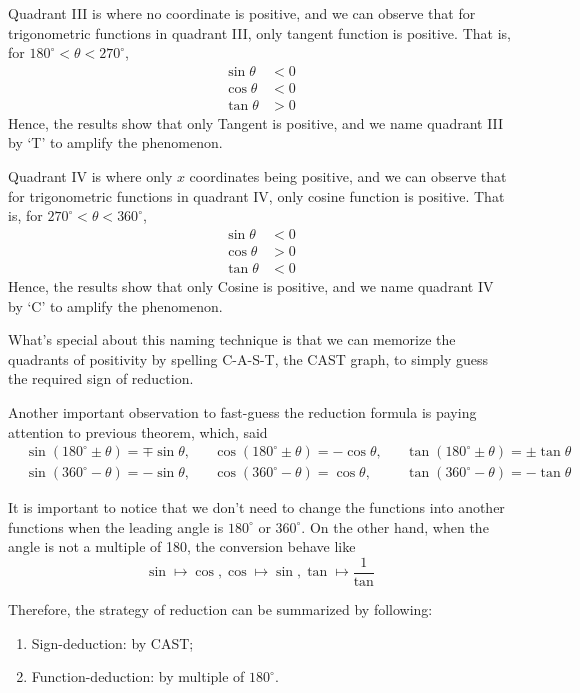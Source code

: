 \documentclass[12pt]{article}
\begin{document}
    Quadrant III is where no coordinate is positive, and we can observe that for trigonometric functions in quadrant III, only tangent function is positive. That is, for $180^\circ<\theta<270^\circ$, \begin{align*}
        \sin{\theta} &< 0\\
        \cos{\theta} &< 0\\
        \tan{\theta} &> 0
    \end{align*}
    Hence, the results show that only Tangent is positive, and we name quadrant III by `T' to amplify the phenomenon.

    Quadrant IV is where only $x$ coordinates being positive, and we can observe that for trigonometric functions in quadrant IV, only cosine function is positive. That is, for $270^\circ<\theta<360^\circ$, \begin{align*}
        \sin{\theta} &< 0\\
        \cos{\theta} &> 0\\
        \tan{\theta} &< 0
    \end{align*}
    Hence, the results show that only Cosine is positive, and we name quadrant IV by `C' to amplify the phenomenon.

    What's special about this naming technique is that we can memorize the quadrants of positivity by spelling C-A-S-T, the CAST graph, to simply guess the required sign of reduction.

    Another important observation to fast-guess the reduction formula is paying attention to previous theorem, which, said \begin{align*}
        &\sin(180^\circ\pm\theta)=\mp\sin{\theta},&&\cos(180^\circ\pm\theta)=-\cos{\theta},&&\tan(180^\circ\pm\theta)=\pm\tan{\theta}\\
        &\sin(360^\circ - \theta)=-\sin{\theta},&&\cos(360^\circ - \theta)=\cos{\theta},&&\tan(360^\circ - \theta)=-\tan{\theta}
    \end{align*}

    It is important to notice that we don't need to change the functions into another functions when the leading angle is $180^\circ$ or $360^\circ$. On the other hand, when the angle is not a multiple of 180, the conversion behave like \[\sin \mapsto \cos, \cos \mapsto \sin, \tan \mapsto \frac{1}{\tan}\]

    Therefore, the strategy of reduction can be summarized by following: \begin{enumerate}
        \item Sign-deduction: by CAST;
        \item Function-deduction: by multiple of $180^\circ$.
    \end{enumerate}
\end{document}
